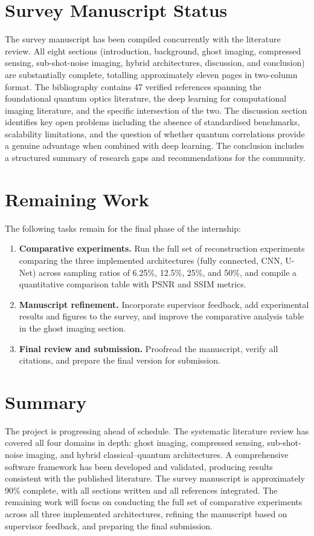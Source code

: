 \documentclass[12pt,a4paper]{article}
\begin{document}
\section{Survey Manuscript Status}
The survey manuscript has been compiled concurrently with the literature review. All eight sections (introduction, background, ghost imaging, compressed sensing, sub-shot-noise imaging, hybrid architectures, discussion, and conclusion) are substantially complete, totalling approximately eleven pages in two-column format. The bibliography contains 47 verified references spanning the foundational quantum optics literature, the deep learning for computational imaging literature, and the specific intersection of the two. The discussion section identifies key open problems including the absence of standardised benchmarks, scalability limitations, and the question of whether quantum correlations provide a genuine advantage when combined with deep learning. The conclusion includes a structured summary of research gaps and recommendations for the community.
\section{Remaining Work}
The following tasks remain for the final phase of the internship:
\begin{enumerate}
    \item \textbf{Comparative experiments.} Run the full set of reconstruction experiments comparing the three implemented architectures (fully connected, CNN, U-Net) across sampling ratios of 6.25\%, 12.5\%, 25\%, and 50\%, and compile a quantitative comparison table with PSNR and SSIM metrics.
    \item \textbf{Manuscript refinement.} Incorporate supervisor feedback, add experimental results and figures to the survey, and improve the comparative analysis table in the ghost imaging section.
    \item \textbf{Final review and submission.} Proofread the manuscript, verify all citations, and prepare the final version for submission.
\end{enumerate}
\section{Summary}
The project is progressing ahead of schedule. The systematic literature review has covered all four domains in depth: ghost imaging, compressed sensing, sub-shot-noise imaging, and hybrid classical--quantum architectures. A comprehensive software framework has been developed and validated, producing results consistent with the published literature. The survey manuscript is approximately 90\% complete, with all sections written and all references integrated. The remaining work will focus on conducting the full set of comparative experiments across all three implemented architectures, refining the manuscript based on supervisor feedback, and preparing the final submission.
\end{document}
